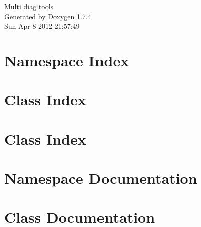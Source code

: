 \documentclass[a4paper]{book}
\begin{document}
\hypersetup{pageanchor=false}
\begin{titlepage}
\vspace*{7cm}
\begin{center}
{\Large Multi diag tools }\\
\vspace*{1cm}
{\large Generated by Doxygen 1.7.4}\\
\vspace*{0.5cm}
{\small Sun Apr 8 2012 21:57:49}\\
\end{center}
\end{titlepage}
\clearemptydoublepage
{}
\tableofcontents
\clearemptydoublepage
{}
\hypersetup{pageanchor=true}
\chapter{Namespace Index}

\chapter{Class Index}

\chapter{Class Index}

\chapter{Namespace Documentation}

\chapter{Class Documentation}









































\printindex
\end{document}

